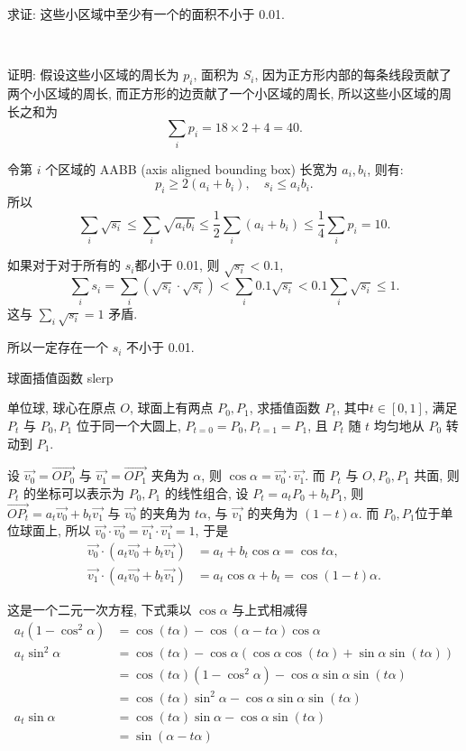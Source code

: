 求证: 这些小区域中至少有一个的面积不小于 0.01.

~

证明: 假设这些小区域的周长为 $ p_i $, 面积为 $ S_i $, 因为正方形内部的每条线段贡献了两个小区域的周长, 而正方形的边贡献了一个小区域的周长, 所以这些小区域的周长之和为 
\[ \sum_i{p_i} = 18\times 2 + 4 = 40 .\]

令第 $ i $ 个区域的 AABB (axis aligned bounding box) 长宽为 $ a_i, b_i $, 则有:
\[ p_i \ge 2(a_i+b_i),\quad s_i \le a_i b_i .\]
所以
\[ \sum_i{\sqrt{s_i}} \le \sum_i{\sqrt{a_i b_i}} \le \frac{1}{2}\sum_i{(a_i+b_i)} \le \frac{1}{4}\sum_i{p_i} = 10 .\]

如果对于对于所有的 $ s_i $都小于 0.01, 则 $ \sqrt{s_i} < 0.1 $, 
\[ \sum_i{s_i} = \sum_i{(\sqrt{s_i}\cdot\sqrt{s_i})} < \sum_i{0.1\sqrt{s_i}} < 0.1\sum_i{\sqrt{s_i}} \le 1 .\]
这与 $ \sum_i{\sqrt{s_i}} = 1 $ 矛盾.

所以一定存在一个 $ s_i $ 不小于 0.01.

\newpage

\noindent 球面插值函数 slerp 

单位球, 球心在原点 $O$, 球面上有两点 $P_0, P_1$, 求插值函数 $P_t$, 其中$t\in[0,1]$, 满足 $P_t$ 与 $P_0, P_1$ 位于同一个大圆上, $P_{t=0} = P_0, P_{t=1}=P_1$, 且 $P_t$ 随 $t$ 均匀地从 $P_0$ 转动到 $P_1$. 

设 $\vec{v_0} = \vec{OP_0}$ 与 $\vec{v_1} = \vec{OP_1}$ 夹角为 $\alpha$, 则 $\cos\alpha = \vec{v_0}\cdot\vec{v_1}$. 而 $P_t$ 与 $O,P_0, P_1$ 共面, 则 $P_t$ 的坐标可以表示为 $P_0, P_1$ 的线性组合, 设 $P_t = a_t P_0 + b_tP_1$, 则 $\vec{OP_t} = a_t \vec{v_0} + b_t \vec{v_1}$ 与 $\vec{v_0}$ 的夹角为 $t\alpha$, 与 $\vec{v_1}$ 的夹角为 $(1-t)\alpha$. 而 $P_0, P_1$位于单位球面上, 所以 $\vec{v_0}\cdot\vec{v_0}=\vec{v_1}\cdot\vec{v_1} = 1$, 于是
\begin{align*}
\vec{v_0}\cdot(a_t \vec{v_0} + b_t \vec{v_1}) &= a_t + b_t\cos\alpha = \cos t\alpha ,\\
\vec{v_1}\cdot(a_t \vec{v_0} + b_t \vec{v_1}) &= a_t\cos\alpha + b_t = \cos (1-t)\alpha .
\end{align*}

这是一个二元一次方程, 下式乘以 $\cos\alpha$ 与上式相减得
\begin{align*}
a_t(1-\cos^2\alpha) &= \cos(t\alpha) - \cos(\alpha-t\alpha) \cos\alpha \\
a_t\sin^2\alpha &= \cos(t\alpha) - \cos\alpha(\cos\alpha\cos(t\alpha)+\sin\alpha\sin(t\alpha))\\
 &= \cos(t\alpha)(1-\cos^2\alpha) - \cos\alpha\sin\alpha\sin(t\alpha)\\
&= \cos(t\alpha)\sin^2\alpha - \cos\alpha\sin\alpha\sin(t\alpha)\\
a_t\sin\alpha &= \cos(t\alpha)\sin\alpha - \cos\alpha\sin(t\alpha)\\
&= \sin(\alpha-t\alpha)
\end{align*}

